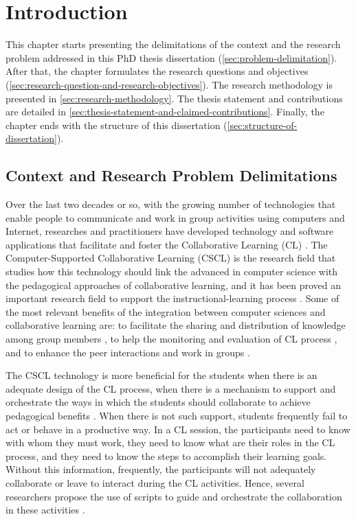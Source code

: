 \chapter{Introduction}
\label{chapter:introducao}

This chapter starts presenting the delimitations of the context and the research problem addressed in this PhD thesis dissertation  (\autoref{sec:problem-delimitation}).
After that, the chapter formulates the research questions and objectives (\autoref{sec:research-question-and-research-objectives}).
The research methodology is presented in \autoref{sec:research-methodology}.
The thesis statement and contributions are detailed in \autoref{sec:thesis-statement-and-claimed-contributions}. 
Finally, the chapter ends with the structure of this dissertation (\autoref{sec:structure-of-dissertation}).

\section{Context and Research Problem Delimitations}
\label{sec:problem-delimitation}

Over the last two decades or so, with the growing number of technologies that enable people to communicate and work in group activities using computers and Internet, researches and practitioners have developed technology and software applications that facilitate and foster the Collaborative Learning (CL) \cite{LehtinenHakkarainenLipponenRahikainenMuukkonen1999}.
The Computer-Supported Collaborative Learning (CSCL) is the research field that studies how this technology should link the advanced in computer science with the pedagogical approaches of collaborative learning, and it has been proved an important research field to support the instructional-learning process \cite{StahlKoschmannSuthers2006}.
Some of the most relevant benefits of the integration between computer sciences and collaborative learning are: to facilitate the sharing and distribution of knowledge among group members \cite{Lipponen2002,NordinKlobas2010},
to help the monitoring and evaluation of CL process \cite{Rodriguez-TrianaPrietoMartinez-MonesAsensio-PerezDimitriadis2018,CaballeDaradoumisXhafaJuan2011},
and to enhance the peer interactions and work in groups \cite{Wang2014,ZhaoGaoYang2018}.

The CSCL technology is more beneficial for the students when there is an adequate design of the CL process, when there is a mechanism to support and orchestrate the ways in which the students should collaborate to achieve pedagogical benefits \cite{Dillenbourg2013, Hewitt2005, IsotaniInabaIkedaMizoguchi2009}.
When there is not such support, students frequently fail to act or behave in a productive way.
In a CL session, the participants need to know with whom they must work,
they need to know what are their roles in the CL process, and
they need to know the steps to accomplish their learning goals.
Without this information, frequently, the participants will not adequately collaborate or leave to interact during the CL activities.
Hence, several researchers propose the use of scripts to guide and orchestrate the collaboration in these activities \cite{AlharbiAthaudaChiong2014}.

